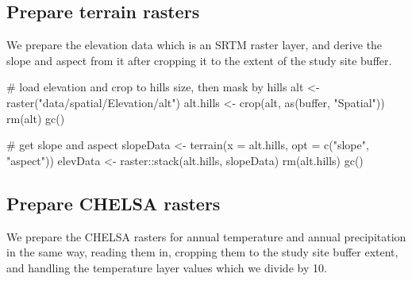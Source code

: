 \documentclass[]{article}
\newenvironment{Shaded}{}{}
\newcommand{\CommentTok}[1]{\textcolor[rgb]{0.00,0.50,0.00}{#1}}
\newcommand{\DataTypeTok}[1]{#1}
\newcommand{\KeywordTok}[1]{\textcolor[rgb]{0.00,0.00,1.00}{#1}}
\newcommand{\NormalTok}[1]{#1}
\newcommand{\OperatorTok}[1]{#1}
\newcommand{\StringTok}[1]{\textcolor[rgb]{0.00,0.50,0.50}{#1}}
\begin{document}
\hypertarget{prepare-terrain-rasters}{%
\subsection{Prepare terrain rasters}\label{prepare-terrain-rasters}}

We prepare the elevation data which is an SRTM raster layer, and derive the slope and aspect from it after cropping it to the extent of the study site buffer.

\begin{Shaded}
\begin{Highlighting}[]
\CommentTok{# load elevation and crop to hills size, then mask by hills}
\NormalTok{alt <-}\StringTok{ }\KeywordTok{raster}\NormalTok{(}\StringTok{"data/spatial/Elevation/alt"}\NormalTok{)}
\NormalTok{alt.hills <-}\StringTok{ }\KeywordTok{crop}\NormalTok{(alt, }\KeywordTok{as}\NormalTok{(buffer, }\StringTok{"Spatial"}\NormalTok{))}
\KeywordTok{rm}\NormalTok{(alt)}
\KeywordTok{gc}\NormalTok{()}

\CommentTok{# get slope and aspect}
\NormalTok{slopeData <-}\StringTok{ }\KeywordTok{terrain}\NormalTok{(}\DataTypeTok{x =}\NormalTok{ alt.hills, }\DataTypeTok{opt =} \KeywordTok{c}\NormalTok{(}\StringTok{"slope"}\NormalTok{, }\StringTok{"aspect"}\NormalTok{))}
\NormalTok{elevData <-}\StringTok{ }\NormalTok{raster}\OperatorTok{::}\KeywordTok{stack}\NormalTok{(alt.hills, slopeData)}
\KeywordTok{rm}\NormalTok{(alt.hills)}
\KeywordTok{gc}\NormalTok{()}
\end{Highlighting}
\end{Shaded}

\hypertarget{prepare-chelsa-rasters}{%
\subsection{Prepare CHELSA rasters}\label{prepare-chelsa-rasters}}

We prepare the CHELSA rasters for annual temperature and annual precipitation in the same way, reading them in, cropping them to the study site buffer extent, and handling the temperature layer values which we divide by 10.
\end{document}
